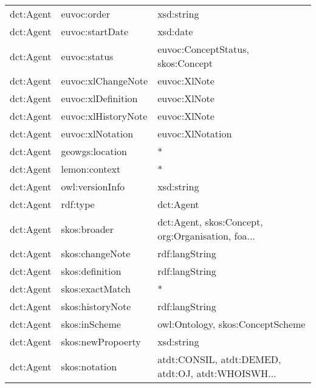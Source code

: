 \documentclass[10pt,a4paper,titlepage,final]{article}
\begin{document}
\begin{longtable}{lll}
           dct:Agent &             euvoc:order &                                         xsd:string \\
           dct:Agent &         euvoc:startDate &                                           xsd:date \\
           dct:Agent &            euvoc:status &                  euvoc:ConceptStatus, skos:Concept \\
           dct:Agent &      euvoc:xlChangeNote &                                       euvoc:XlNote \\
           dct:Agent &      euvoc:xlDefinition &                                       euvoc:XlNote \\
           dct:Agent &     euvoc:xlHistoryNote &                                       euvoc:XlNote \\
           dct:Agent &        euvoc:xlNotation &                                   euvoc:XlNotation \\
           dct:Agent &         geowgs:location &                                                  * \\
           dct:Agent &           lemon:context &                                                  * \\
           dct:Agent &         owl:versionInfo &                                         xsd:string \\
           dct:Agent &                rdf:type &                                          dct:Agent \\
           dct:Agent &            skos:broader &  dct:Agent, skos:Concept, org:Organisation, foa... \\
           dct:Agent &         skos:changeNote &                                     rdf:langString \\
           dct:Agent &         skos:definition &                                     rdf:langString \\
           dct:Agent &         skos:exactMatch &                                                  * \\
           dct:Agent &        skos:historyNote &                                     rdf:langString \\
           dct:Agent &           skos:inScheme &                   owl:Ontology, skos:ConceptScheme \\
           dct:Agent &       skos:newPropoerty &                                         xsd:string \\
           dct:Agent &           skos:notation &  atdt:CONSIL, atdt:DEMED, atdt:OJ, atdt:WHOISWH... \\

\end{longtable}
\end{document}
